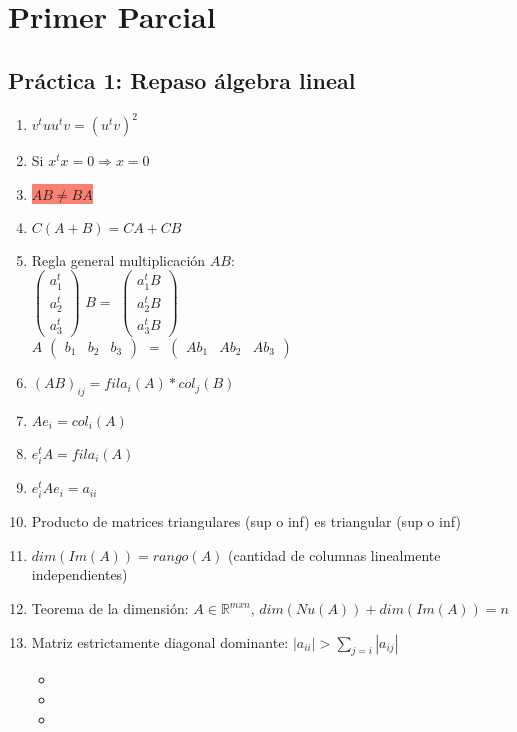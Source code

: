 \section*{Primer Parcial}
\subsection*{Práctica 1: Repaso álgebra lineal}
\begin{enumerate}
    \item $v^tuu^tv = (u^tv)^2$
    \item Si $x^tx=0 \Rightarrow x = 0$
    \item \colorbox{Salmon}{$AB \neq BA$}
    \item $C(A+B) = CA + CB$
    \item Regla general multiplicación $AB$: \\
    $ \begin{pmatrix}
a_1^t \\
a_2^t \\
a_3^t 
\end{pmatrix}$ $B = $ $\begin{pmatrix}
a_1^t B \\
a_2^tB \\
a_3^tB 
\end{pmatrix} $ \\
\linebreak
$A$ $ \begin{pmatrix}
b_1 & b_2 & b_3 
\end{pmatrix} $   $=$ $\begin{pmatrix}
Ab_1 & Ab_2 & Ab_3 
\end{pmatrix}  $
    \item $(AB)_{ij} = fila_i(A)*col_j(B)$
    \item $Ae_{i} = col_i(A)$
    \item $e_i^tA = fila_i(A)$
    \item $e_i^tAe_i = a_{ii}$
    \item Producto de matrices triangulares (sup o inf) es triangular (sup o inf)
    \item $dim(Im(A)) = rango(A)$ (cantidad de columnas linealmente independientes)
    \item Teorema de la dimensión: $A \in \mathbb{R}^{mxn}$, $dim(Nu(A)) + dim(Im(A)) = n$
    \item Matriz estrictamente diagonal dominante: $|a_{ii}| > \sum_{j=i}{}|a_{ij}|$
    \begin{itemize}
    \item {}
	\item {}
	\item {}


\end{itemize}
\end{enumerate}

